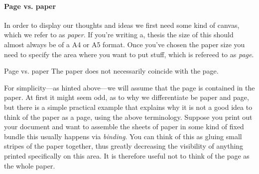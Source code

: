\paragraph{Page vs. paper}
In order to display our thoughts and ideas we first need some kind of canvas, which we
refer to as \textit{paper}. If you're writing a, thesis the size of this 
should almost always be of a A4 or A5 format. Once you've chosen the paper size you 
need to specify the area where you want to put stuff, which is refereed to as \textit{page}.
\begin{memo}{Page vs. paper}{}
The paper does not necessarily coincide with the page.
\end{memo}
For simplicity---as hinted above---we will assume that the page is contained in the paper. 
At first it might seem odd, as to why we differentiate be paper and page, but there is a 
simple practical example that explains why it is not a good idea to think of the paper as 
a page, using the above terminology. Suppose you print 
out your document and want to assemble the sheets of paper in some kind of fixed bundle 
this usually happens via \textit{binding}. You can think of this as gluing small stripes 
of the paper together, thus greatly decreasing the visibility of anything printed 
specifically on this area. It is therefore useful not to think of the page as the whole paper.
\par
